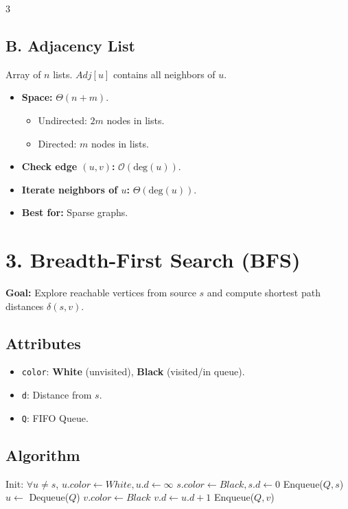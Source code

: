 \documentclass[10pt, a4paper, landscape]{article}
\newcommand{\bigO}{\mathcal{O}}
\begin{document}
\begin{multicols*}{3}
\subsection*{B. Adjacency List}
Array of $n$ lists. $Adj[u]$ contains all neighbors of $u$.
\begin{itemize}
    \item \textbf{Space:} $\Theta(n + m)$.
        \begin{itemize}
            \item Undirected: $2m$ nodes in lists.
            \item Directed: $m$ nodes in lists.
        \end{itemize}
    \item \textbf{Check edge $(u, v)$:} $\bigO(\text{deg}(u))$.
    \item \textbf{Iterate neighbors of $u$:} $\Theta(\text{deg}(u))$.
    \item \textbf{Best for:} Sparse graphs.
\end{itemize}

\section{3. Breadth-First Search (BFS)}
\textbf{Goal:} Explore reachable vertices from source $s$ and compute shortest path distances $\delta(s, v)$.

\subsection*{Attributes}
\begin{itemize}
    \item \texttt{color}: \textbf{White} (unvisited), \textbf{Black} (visited/in queue).
    \item \texttt{d}: Distance from $s$.
    \item \texttt{Q}: FIFO Queue.
\end{itemize}

\subsection*{Algorithm}
\begin{algorithmic}[1]
\STATE Init: $\forall u \ne s$, $u.color \leftarrow White, u.d \leftarrow \infty$
\STATE $s.color \leftarrow Black, s.d \leftarrow 0$
\STATE Enqueue($Q, s$)
    \STATE $u \leftarrow$ Dequeue($Q$)
            \STATE $v.color \leftarrow Black$
            \STATE $v.d \leftarrow u.d + 1$
            \STATE Enqueue($Q, v$)
        \ENDIF
    \ENDFOR
\ENDWHILE
\end{algorithmic}


\end{multicols*}
\end{document}
